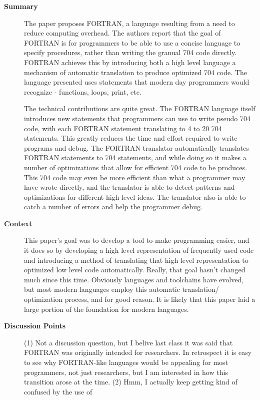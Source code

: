 \begin{description}
    \item[\textbf{Summary}]
    The paper proposes FORTRAN, a language resulting from a need to reduce 
    computing overhead. The authors report that the goal of FORTRAN is for
    programmers to be able to use a concise language to specify procedures,
    rather than writing the granual 704 code directly. FORTRAN achieves this by
    introducing both a high level language a mechanism of automatic translation
    to produce optimized 704 code. The language presented uses statements that
    modern day programmers would recognize - functions, loops, print, etc.

    The technical contributions are quite great. The FORTRAN language itself
    introduces new statements that programmers can use to write pseudo 704 code,
    with each FORTRAN statement translating to 4 to 20 704 statements. This
    greatly reduces the time and effort required to write programs and debug.
    The FORTRAN translator automatically translates FORTRAN statements to 704
    statements, and while doing so it makes a number of optimizations that
    allow for efficient 704 code to be produces. This 704 code may even be more
    efficient than what a programmer may have wrote directly, and the translator
    is able to detect patterns and optimizations for different high level ideas.
    The translator also is able to catch a number of errors and help the
    programmer debug.
    \item[\textbf{Context}]
    This paper's goal was to develop a tool to make programming easier, and it
    does so by developing a high level representation of frequently used code
    and introducing a method of translating that high level representation to
    optimized low level code automatically. Really, that goal hasn't changed
    much since this time. Obviously languages and toolchains have evolved, but
    most modern languages employ this automatic translation/ optimization
    process, and for good reason. It is likely that this paper laid a large
    portion of the foundation for modern languages.
    \item[\textbf{Discussion Points}]
    (1) Not a discussion question, but I belive last class it was said that
    FORTRAN was originally intended for researchers. In retrospect it is easy to
    see why FORTRAN-like languages would be appealing for most programmers, not
    just researchers, but I am interested in how this transition arose at the
    time. (2) Hmm, I actually keep getting kind of confused by the use of

\end{description}
